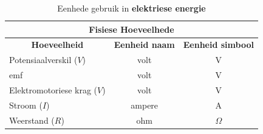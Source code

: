 \begin{table}[H]
\begin{center}
\begin{tabular}{|l|c|c|}\hline \hline 
\multicolumn{3}{|c|}{\textbf{Fisiese Hoeveelhede}}\\ \hline \hline
\multicolumn{1}{|c|}{\textbf{Hoeveelheid}} & \textbf{Eenheid naam} & \textbf{Eenheid simbool}\\ \hline
Potensiaalverskil ($V$) & volt & V \\ \hline
emf & volt & V \\ \hline
Elektromotoriese krag ($V$) & volt & V \\ \hline
Stroom ($I$) & ampere & A \\ \hline
Weerstand ($R$) & ohm & $\Omega$ \\ \hline 
\end{tabular}
\end{center}
\caption{Eenhede gebruik in \textbf{elektriese energie} }
\label{table:electrostatics::units}
\end{table}


